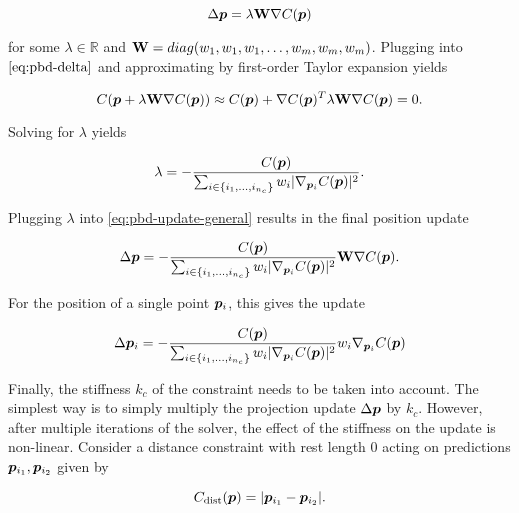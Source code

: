 \begin{equation}\label{eq:pbd-update-general}
    \Delta \bm{p} = \lambda \mathbf{W} \nabla C(\bm{p})
\end{equation}

\noindent for some $\lambda \in \mathbb{R}$ and $\mathbf{W} = diag(w_1, w_1, w_1, \ldots, w_m, w_m, w_m)$. 
Plugging into $\autoref{eq:pbd-delta}$ and approximating by first-order Taylor expansion yields

\[
    C(\bm{p} + \lambda \mathbf{W} \nabla C(\bm{p})) \approx C(\bm{p}) + \nabla C(\bm{p})^T \lambda \mathbf{W}
    \nabla C(\bm{p}) = 0.
\]

\noindent Solving for $\lambda$ yields

\begin{equation}\label{eq:pbd-lambda}
    \lambda = -\frac{C(\bm{p})}{\sum_{i \in \{ i_1, \ldots, i_{n_c} \}} w_i \vert \nabla_{\bm{p}_i}C(\bm{p}) \vert^2 }.
\end{equation}

\noindent Plugging $\lambda$ into \autoref{eq:pbd-update-general} results in the final position update

\begin{equation}\label{eq:pbd-update}
    \Delta \bm{p} = -\frac{C(\bm{p})}{\sum_{i \in \{ i_1, \ldots, i_{n_c} \}} w_i \vert \nabla_{\bm{p}_i}C(\bm{p}) \vert^2 } 
    \mathbf{W}\nabla C(\bm{p}).
\end{equation}

\noindent For the position of a single point $\bm{p}_i$, this gives the update

\begin{equation}\label{eq:pbd-update-individual}
    \Delta \bm{p}_i = -\frac{C(\bm{p})}{\sum_{i \in \{ i_1, \ldots, i_{n_c} \}} w_i \vert \nabla_{\bm{p}_i}C(\bm{p}) \vert^2 } 
    w_i \nabla_{\bm{p}_i} C(\bm{p})
\end{equation}

Finally, the stiffness $k_c$ of the constraint needs to be taken into account. The simplest way is to simply multiply the projection update
$\Delta \bm{p}$ by $k_c$. However, after multiple iterations of the solver, the effect of the stiffness on the update is non-linear. Consider
a distance constraint with rest length 0 acting on predictions $\bm{p}_{i_1}, \bm{p}_{i_2}$ given by

\begin{equation}\label{eq:pbd-distance}
    C_{\text{dist}}(\bm{p}) = \vert \bm{p}_{i_1} - \bm{p}_{i_2} \vert.
\end{equation}

